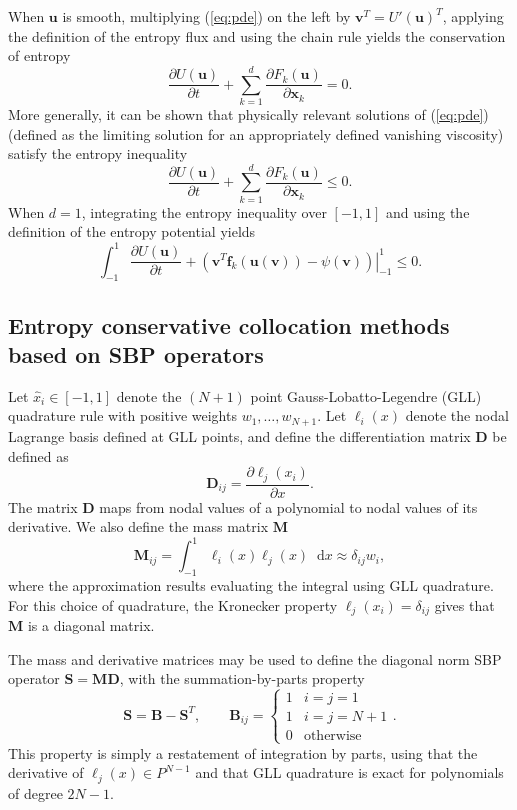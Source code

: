 \documentclass[preprint,10pt]{article}
\theoremstyle{definition}
\theoremstyle{lemma}
\theoremstyle{theorem}
\newcommand{\pd}[2]{\frac{\partial#1}{\partial#2}}
\newcommand{\LRp}[1]{\left( #1 \right)}
\newcommand{\note}[1]{{\color{blue}{#1}}}
\newcommand*\diff[1]{\mathop{}\!{\mathrm{d}#1}}
\begin{document}
When $\bm{u}$ is smooth, multiplying (\ref{eq:pde}) on the left by $\bm{v}^T = U'(\bm{u})^T$, applying the definition of the entropy flux and using the chain rule yields the conservation of entropy
\[
\pd{U(\bm{u})}{t} + \sum_{k=1}^d \pd{F_k(\bm{u})}{\bm{x}_k} = 0.
\]
More generally, it can be shown that physically relevant solutions of (\ref{eq:pde}) (defined as the limiting solution for an appropriately defined vanishing viscosity) satisfy the entropy inequality
\[
\pd{U(\bm{u})}{t} + \sum_{k=1}^d \pd{F_k(\bm{u})}{\bm{x}_k} \leq 0.  
\]
When $d = 1$, integrating the entropy inequality over $[-1,1]$ and using the definition of the entropy potential yields
\begin{equation}
\int_{-1}^1 \pd{U(\bm{u})}{t} + \left.\LRp{\bm{v}^T\bm{f}_k(\bm{u}(\bm{v}))-\psi(\bm{v})}\right|_{-1}^1 \leq 0.  
\label{eq:consentropy}
\end{equation}



\subsection{Entropy conservative collocation methods based on SBP operators}

Let $\widehat{x}_i \in [-1,1]$ denote the $(N+1)$ point Gauss-Lobatto-Legendre (GLL) quadrature rule with positive weights $w_1,\ldots,w_{N+1}$.  Let $\ell_i(x)$ denote the nodal Lagrange basis defined at GLL points, and define the differentiation matrix $\bm{D}$ be defined as 
\[
\bm{D}_{ij} = \pd{\ell_j(x_i)}{x}.
\]
The matrix $\bm{D}$ maps from nodal values of a polynomial to nodal values of its derivative.  We also define the mass matrix $\bm{M}$
\[
\bm{M}_{ij} = \int_{-1}^1 \ell_i(x)\ell_j(x)\diff{x} \approx \delta_{ij} w_i,
\]
where the approximation results evaluating the integral using GLL quadrature.  For this choice of quadrature, the Kronecker property $\ell_j(x_i) = \delta_{ij}$ gives that $\bm{M}$ is a diagonal matrix.  

The mass and derivative matrices may be used to define the diagonal norm SBP operator $\bm{S} = \bm{M}\bm{D}$, with the summation-by-parts property 
\[
\bm{S} = \bm{B} - \bm{S}^T, \qquad \bm{B}_{ij} = \begin{cases}
1 &i = j = 1 \\
1 &i = j = N+1 \\
0 &\text{otherwise}
\end{cases}.
\]
This property is simply a restatement of integration by parts, using that the derivative of $\ell_j(x) \in P^{N-1}$ and that GLL quadrature is exact for polynomials of degree $2N-1$.  
\end{document}
